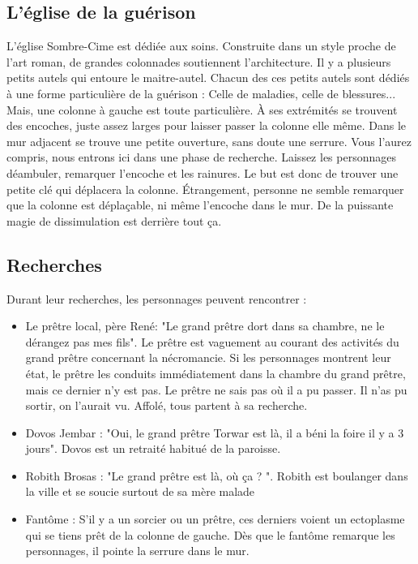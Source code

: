 \documentclass[a4paper, 11pt]{article}
\begin{document}
\subsection{L'église de la guérison}
L'église Sombre-Cime est dédiée aux soins. Construite dans un style proche de l'art roman, de grandes colonnades soutiennent l'architecture. Il y a plusieurs petits autels qui entoure le maitre-autel. Chacun des ces petits autels sont dédiés à une forme particulière de la guérison : Celle de maladies, celle de blessures... Mais, une colonne à gauche est toute particulière. À ses extrémités se trouvent des encoches, juste assez larges pour laisser passer la colonne elle même. Dans le mur adjacent se trouve une petite ouverture, sans doute une serrure. Vous l'aurez compris, nous entrons ici dans une phase de recherche. Laissez les personnages déambuler, remarquer l'encoche et les rainures. Le but est donc de trouver une petite clé qui déplacera la colonne. Étrangement, personne ne semble remarquer que la colonne est déplaçable, ni même l'encoche dans le mur. De la puissante magie de dissimulation est derrière tout ça.

\subsection{Recherches}
Durant leur recherches, les personnages peuvent rencontrer :
\begin{itemize}
\item Le prêtre local, père René: "Le grand prêtre dort dans sa chambre, ne le dérangez pas mes fils". Le prêtre est vaguement au courant des activités du grand prêtre concernant la nécromancie. Si les personnages montrent leur état, le prêtre les conduits immédiatement dans la chambre du grand prêtre, mais ce dernier n'y est pas. Le prêtre ne sais pas où il a pu passer. Il n'as pu sortir, on l’aurait vu. Affolé, tous partent à sa recherche.
\item Dovos Jembar : "Oui, le grand prêtre Torwar est là, il a béni la foire il y a 3 jours". Dovos est un retraité habitué de la paroisse.
\item Robith Brosas : "Le grand prêtre est là, où ça ? ". Robith est boulanger dans la ville et se soucie surtout de sa mère malade
\item Fantôme : S'il y a un sorcier ou un prêtre, ces derniers voient un ectoplasme qui se tiens prêt de la colonne de gauche. Dès que le fantôme remarque les personnages, il pointe la serrure dans le mur.
\end{itemize}
\end{document}
